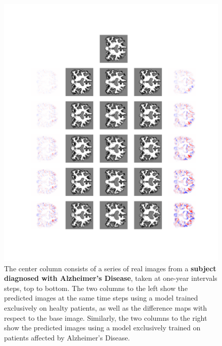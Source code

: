 \begin{figure}
	\centering
	\includegraphics[width=\linewidth, trim={100 100 66 30}, clip]{images/HC_AD_plots/comp_ADNI_141445}
	\vspace*{-15pt}
	\caption{The center column consists of a series of real images from a \textbf{subject diagnosed with Alzheimer's Disease}, taken at one-year intervals steps, top to bottom. The two columns to the left show the predicted images at the same time steps using a model trained exclusively on healty patients, as well as the difference maps with respect to the base image. Similarly, the two columns to the right show the predicted images using a model exclusively trained on patients affected by Alzheimer's Disease.}
	\label{fig:hcad_ad}
\end{figure}

